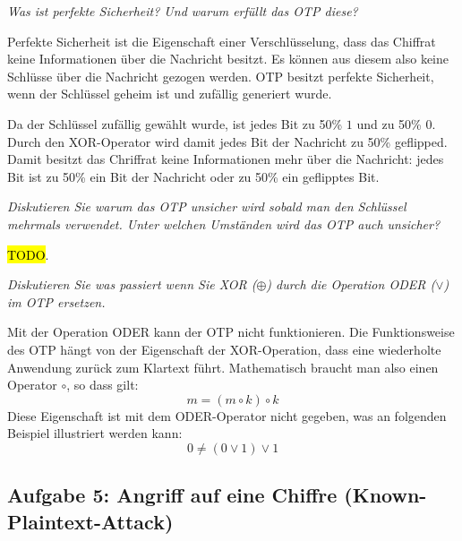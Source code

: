 \documentclass[
  ngerman,
  DIV=12
]{scrartcl}
\begin{document}
\bigskip\noindent
\emph{Was ist perfekte Sicherheit? Und warum erfüllt das OTP diese?}

\medskip\noindent
Perfekte Sicherheit ist die Eigenschaft einer Verschlüsselung, dass das Chiffrat keine Informationen über die Nachricht besitzt. Es können aus diesem also keine Schlüsse über die Nachricht gezogen werden. OTP besitzt perfekte Sicherheit, wenn der Schlüssel geheim ist und zufällig generiert wurde. 

Da der Schlüssel zufällig gewählt wurde, ist jedes Bit zu 50\% $1$ und zu 50\% $0$. Durch den XOR-Operator wird damit jedes Bit der Nachricht zu 50\% geflipped. Damit besitzt das Chriffrat keine Informationen mehr über die Nachricht: jedes Bit ist zu 50\% ein Bit der Nachricht oder zu 50\% ein geflipptes Bit. 

\bigskip\noindent
\emph{Diskutieren Sie warum das OTP unsicher wird sobald man den Schlüssel mehrmals verwendet. Unter welchen Umständen wird das OTP auch unsicher?}

\medskip\noindent
\hl{TODO}.

\bigskip\noindent
\emph{Diskutieren Sie was passiert wenn Sie XOR ($\oplus$) durch die Operation ODER ($\vee$) im OTP ersetzen.}

\medskip\noindent
Mit der Operation ODER kann der OTP nicht funktionieren. Die Funktionsweise des OTP hängt von der Eigenschaft der XOR-Operation, dass eine wiederholte Anwendung zurück zum Klartext führt. Mathematisch braucht man also einen Operator $\circ$, so dass gilt:
\begin{equation*}
m = (m \circ k) \circ k  
\end{equation*}
Diese Eigenschaft ist mit dem ODER-Operator nicht gegeben, was an folgenden Beispiel illustriert werden kann:
\begin{equation*}
0 \neq (0 \vee 1) \vee 1
\end{equation*}

\subsection*{Aufgabe 5: Angriff auf eine Chiffre (Known-Plaintext-Attack)}
\end{document}
